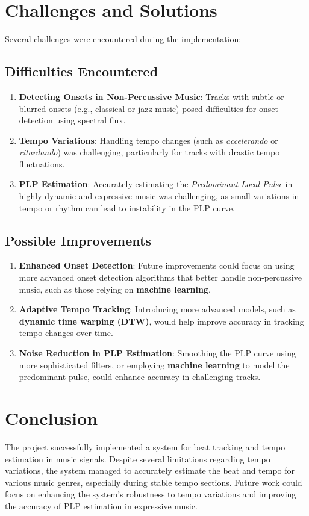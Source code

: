 \documentclass[
paper=A4,               %
pagesize=auto,          %
fontsize=12pt,          %
DIV=16,                 %
twoside=false,           %
BCOR=20mm,              %
parskip=false,          %
chapterprefix=true,     %
appendixprefix=true,    %
listof=totoc,           %
bibliography=totoc,     %
headinclude=true,       %
footinclude=false,      %
headsepline=false,       %
footsepline=false,      %
headings=small,         %
numbers=noenddot        %
] {scrbook}
\begin{document}
\section*{Challenges and Solutions}

Several challenges were encountered during the implementation:

\subsection*{Difficulties Encountered}
\begin{enumerate}
    \item \textbf{Detecting Onsets in Non-Percussive Music}: Tracks with subtle or blurred onsets (e.g., classical or jazz music) posed difficulties for onset detection using spectral flux.
    \item \textbf{Tempo Variations}: Handling tempo changes (such as \textit{accelerando} or \textit{ritardando}) was challenging, particularly for tracks with drastic tempo fluctuations.
    \item \textbf{PLP Estimation}: Accurately estimating the \textit{Predominant Local Pulse} in highly dynamic and expressive music was challenging, as small variations in tempo or rhythm can lead to instability in the PLP curve.
\end{enumerate}

\subsection*{Possible Improvements}
\begin{enumerate}
    \item \textbf{Enhanced Onset Detection}: Future improvements could focus on using more advanced onset detection algorithms that better handle non-percussive music, such as those relying on \textbf{machine learning}.
    \item \textbf{Adaptive Tempo Tracking}: Introducing more advanced models, such as \textbf{dynamic time warping (DTW)}, would help improve accuracy in tracking tempo changes over time.
    \item \textbf{Noise Reduction in PLP Estimation}: Smoothing the PLP curve using more sophisticated filters, or employing \textbf{machine learning} to model the predominant pulse, could enhance accuracy in challenging tracks.
\end{enumerate}
\section*{Conclusion}
The project successfully implemented a system for beat tracking and tempo estimation in music signals. Despite several limitations regarding tempo variations, the system managed to accurately estimate the beat and tempo for various music genres, especially during stable tempo sections. Future work could focus on enhancing the system's robustness to tempo variations and improving the accuracy of PLP estimation in expressive music.



\end{document}
